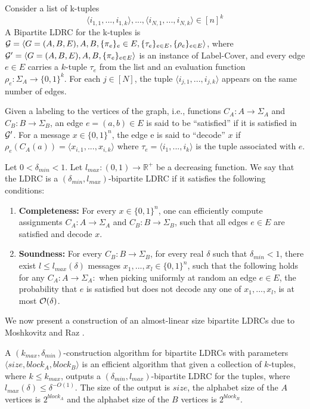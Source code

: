 \begin{definition}\label{def:LDRC}
Consider a list of k-tuples
\[
\langle i_{1,1}, . . . , i_{1,k}\rangle, . . . , \langle i_{N,1}, . . . , i_{N,k} \rangle \in [n]^k
\]
A Bipartite LDRC for the k-tuples is ${\cal G} = \langle G =
(A,B,E),A,B,\{\pi_{e}\}_e \in E, \{\tau_e\}_{e \in E},\{\rho_e\}_{e
  \in E}\rangle$, where ${\cal G}' = \langle G = (A,B,E),A,B,
\{\pi_e\}_{e \in E} \rangle$ is an instance of {\sf Label-Cover}, and
  every edge $e \in E$ carries a $k$-tuple $\tau_e$ from the list and
  an evaluation function $\rho_e : \Sigma_A \rightarrow \{0, 1\}^k$.
  For each $j \in [N]$, the tuple $\langle i_{j,1}, . . . ,
  i_{j,k}\rangle$ appears on the same number of edges.

  Given a labeling to the vertices of the graph, i.e., functions $C_A
  : A \rightarrow \Sigma_A$ and $C_B : B \rightarrow \Sigma_B$, an
  edge $e = (a, b) \in E$ is said to be ``satisfied'' if it is
  satisfied in ${\cal G}'$. For a message $x \in \{0, 1\}^n$, the edge
  e is said to ``decode'' $x$ if $\rho_e(C_A(a)) = \langle x_{i,1} ,
  . . . , x_{i,k}\rangle$ where $\tau_e = \langle i_1, . . . ,
  i_k\rangle$ is the tuple associated with $e$. 

 Let $0 < \delta_{min} < 1$. Let $l_{max} : (0, 1) \rightarrow
 {\mathbb R}^+$ be a decreasing function. We say that the LDRC is a
 $(\delta_{min}, l_{max})$-bipartite LDRC if it satisfies the following
 conditions: 
 \begin{enumerate}
 \item{\bf Completeness:} For every $x \in \{0, 1\}^n$, one can
   efficiently compute assignments $C_A : A \rightarrow \Sigma_A$ and
   $C_B : B \rightarrow \Sigma_B$, such that all edges $e \in E$ are
   satisfied and decode $x$. 

  \item {\bf Soundness:} For every $C_B : B \rightarrow \Sigma_B$, for
    every real $\delta$ such that $\delta_{min} < 1$, there exist $l
    \le l_{max}(\delta)$ messages $x_1, . . . , x_l \in \{0, 1\}^n$,
    such that the following holds for any $C_A : A \rightarrow
    \Sigma_A:$ when picking uniformly at random an edge $e \in E$, the
    probability that $e$ is satisfied but does not decode any one of
    $x_1, . . . , x_l$, is at most ${\cal O(\delta)}$.
\end{enumerate}
\end{definition}

We now present a construction of an almost-linear size bipartite LDRCs due to Moshkovitz and Raz \cite{MR08}.
\begin{definition}\label{cons}
  A $(k_{max}, \delta_{min})$-construction algorithm for bipartite
  LDRCs with parameters $\langle size, block_A, block_B \rangle$ is an
  efficient algorithm that given a collection of $k$-tuples, where $k
  \le k_{max}$, outputs a $(\delta_{min}, l_{max})$-bipartite LDRC for
  the tuples, where $l_{max}(\delta) \le \delta^{−O(1)}$. The size of
  the output is $size$, the alphabet size of the $A$ vertices is
  $2^{block_A}$ and the alphabet size of the $B$ vertices is
  $2^{block_B}$.
\end{definition}

